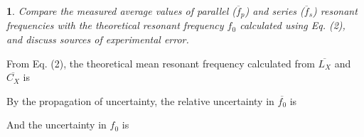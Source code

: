 \documentclass[12pt,oneside,a4paper]{article}
\theoremstyle{definition}
\newtheorem{bt}{}
\begin{document}
	\begin{bt}
		\textit{Compare the measured average values of parallel ($\overline{f}_p$) and series ($\overline{f}_s$) resonant frequencies with the theoretical resonant frequency $f_0$ calculated using Eq. (2), and discuss sources of experimental error.}
		
		\vspace{0.2cm}
		\noindent
		From Eq. (2), the theoretical mean resonant frequency calculated from $\overline{L_X}$ and $\overline{C_X}$ is
		\begin{center}
		\end{center}
		
		\noindent
		By the propagation of uncertainty, the relative uncertainty in $\overline{f_0}$ is
		\begin{center}
		\end{center}
		
		\noindent
		And the uncertainty in $f_0$ is
		\begin{center}
		\end{center}
		

\end{bt}
\end{document}
